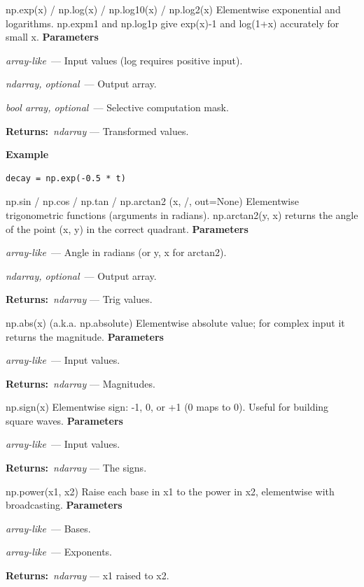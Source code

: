 \documentclass[10pt]{article}
\newenvironment{params}
  {\smallskip\textbf{\small\color{accent}Parameters}\par\nopagebreak
   \begin{description}[leftmargin=1.3em,itemsep=1.5pt,parsep=0pt,topsep=1pt,
      labelindent=0pt,style=sameline,font=\normalfont]}
  {\end{description}}
\newcommand{\pitem}[3]{\item[{\ttfamily\color{accent}#1}]{\itshape #2}\ --- #3}
\newcommand{\preturn}[2]{\smallskip\textbf{\small\color{accent}Returns:}\ {\itshape #1} --- #2\par}
\begin{document}
\begin{func}{np.exp(x) / np.log(x) / np.log10(x) / np.log2(x)}
Elementwise exponential and logarithms. np.expm1 and np.log1p give exp(x)-1 and log(1+x) accurately for small x.
\begin{params}
\pitem{x}{array-like}{Input values (log requires positive input).}
\pitem{out}{ndarray, optional}{Output array.}
\pitem{where}{bool array, optional}{Selective computation mask.}
\end{params}
\preturn{ndarray}{Transformed values.}
\smallskip\textbf{\small\color{accent}Example}
\begin{lstlisting}[style=py]
decay = np.exp(-0.5 * t)
\end{lstlisting}
\end{func}
\medskip

\begin{func}{np.sin / np.cos / np.tan / np.arctan2 (x, /, out=None)}
Elementwise trigonometric functions (arguments in radians). np.arctan2(y, x) returns the angle of the point (x, y) in the correct quadrant.
\begin{params}
\pitem{x}{array-like}{Angle in radians (or y, x for arctan2).}
\pitem{out}{ndarray, optional}{Output array.}
\end{params}
\preturn{ndarray}{Trig values.}
\end{func}
\medskip

\begin{func}{np.abs(x)  (a.k.a. np.absolute)}
Elementwise absolute value; for complex input it returns the magnitude.
\begin{params}
\pitem{x}{array-like}{Input values.}
\end{params}
\preturn{ndarray}{Magnitudes.}
\end{func}
\medskip

\begin{func}{np.sign(x)}
Elementwise sign: -1, 0, or +1 (0 maps to 0). Useful for building square waves.
\begin{params}
\pitem{x}{array-like}{Input values.}
\end{params}
\preturn{ndarray}{The signs.}
\end{func}
\medskip

\begin{func}{np.power(x1, x2)}
Raise each base in x1 to the power in x2, elementwise with broadcasting.
\begin{params}
\pitem{x1}{array-like}{Bases.}
\pitem{x2}{array-like}{Exponents.}
\end{params}
\preturn{ndarray}{x1 raised to x2.}
\end{func}
\medskip
\end{document}
